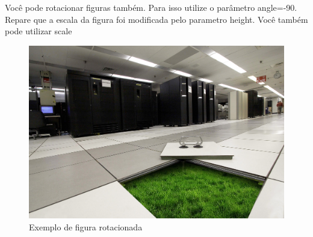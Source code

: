 \documentclass[	DIV=calc,%
							paper=a4,%
							fontsize=12pt,%
							onecolumn]{scrartcl}	 					%
\begin{document}
Você pode rotacionar figuras também. Para isso utilize o parâmetro angle=-90. Repare que a escala da figura foi modificada pelo parametro height. Você também pode utilizar scale

\begin{figure}
	\centering
	\includegraphics[height=\textwidth,angle=-90]{fig3}
	\caption{Exemplo de figura rotacionada}
	\label{fig3}
\end{figure}




\end{document}
